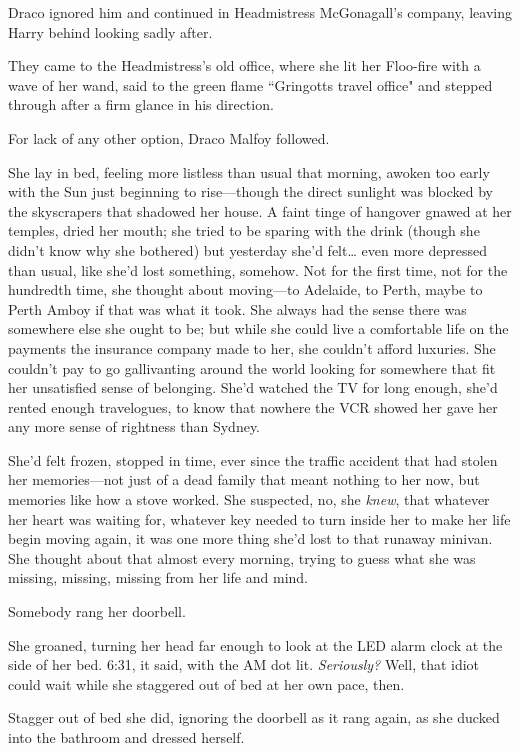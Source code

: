 Draco ignored him and continued in Headmistress McGonagall's company, leaving Harry behind looking sadly after.

They came to the Headmistress's old office, where she lit her Floo-fire with a wave of her wand, said to the green flame ``Gringotts travel office" and stepped through after a firm glance in his direction.

For lack of any other option, Draco Malfoy followed.

\later

She lay in bed, feeling more listless than usual that morning, awoken too early with the Sun just beginning to rise—though the direct sunlight was blocked by the skyscrapers that shadowed her house. A faint tinge of hangover gnawed at her temples, dried her mouth; she tried to be sparing with the drink (though she didn't know why she bothered) but yesterday she'd felt{\ldots} even more depressed than usual, like she'd lost something, somehow. Not for the first time, not for the hundredth time, she thought about moving—to Adelaide, to Perth, maybe to Perth Amboy if that was what it took. She always had the sense there was somewhere else she ought to be; but while she could live a comfortable life on the payments the insurance company made to her, she couldn't afford luxuries. She couldn't pay to go gallivanting around the world looking for somewhere that fit her unsatisfied sense of belonging. She'd watched the TV for long enough, she'd rented enough travelogues, to know that nowhere the VCR showed her gave her any more sense of rightness than Sydney.

She'd felt frozen, stopped in time, ever since the traffic accident that had stolen her memories—not just of a dead family that meant nothing to her now, but memories like how a stove worked. She suspected, no, she \emph{knew}, that whatever her heart was waiting for, whatever key needed to turn inside her to make her life begin moving again, it was one more thing she'd lost to that runaway minivan. She thought about that almost every morning, trying to guess what she was missing, missing, missing from her life and mind.

Somebody rang her doorbell.

She groaned, turning her head far enough to look at the LED alarm clock at the side of her bed. 6:31, it said, with the AM dot lit. \emph{Seriously?} Well, that idiot could wait while she staggered out of bed at her own pace, then.

Stagger out of bed she did, ignoring the doorbell as it rang again, as she ducked into the bathroom and dressed herself.

